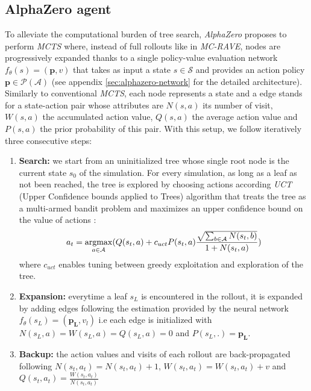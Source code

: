 \documentclass[journal, a4paper]{IEEEtran}
\newcommand{\argmax}{\operatornamewithlimits{argmax}}
\begin{document}
\subsection{AlphaZero agent}
\label{ssec:alphazero}
    To alleviate the computational burden of tree search, \textit{AlphaZero}\cite{alphazero} proposes to perform \textit{MCTS} where, instead of full rollouts like in \textit{MC-RAVE}, nodes are progressively expanded thanks to a single policy-value evaluation network $f_\theta(s)=(\mathbf{p}, v)$ that takes as input a state $s\in \mathcal{S}$ and provides an action policy $\mathbf{p}\in\mathcal{P}(\mathcal{A})$ (see appendix \ref{sec:alphazero-network} for the detailed architecture). Similarly to conventional \textit{MCTS}, each node represents a state and a edge stands for a state-action pair whose attributes are $N(s,a)$ its number of visit, $W(s,a)$ the accumulated action value, $Q(s,a)$ the average action value and $P(s,a)$ the prior probability of this pair. With this setup, we follow iteratively three consecutive steps:
    \begin{enumerate}
        \item \textbf{Search:} we start from an uninitialized tree whose single root node is the current state $s_0$ of the simulation. For every simulation, as long as a leaf as not been reached, the tree is explored by choosing actions according \textit{UCT} (Upper Confidence bounds applied to Trees) algorithm that treats the tree as a multi-armed bandit problem and maximizes an upper confidence bound on the value of actions : $$a_t=\argmax_{a\in\mathcal{A}}(Q(s_t, a)+c_{uct}P(s_t,a)\frac{\sqrt{\sum_{b\in\mathcal{A}}N(s_t, b)}}{1+N(s_t,a)})$$ where $c_{uct}$ enables tuning between greedy exploitation and exploration of the tree.
        \item \textbf{Expansion:} everytime a leaf $s_L$ is encountered in the rollout, it is expanded by adding edges following the estimation provided by the neural network $f_\theta(s_L)=(\mathbf{p_L}, v_l)$ i.e each edge is initialized with $N(s_L, a)=W(s_L,a)=Q(s_L,a)=0$ and $P(s_L,.)=\mathbf{p_L}$.
        \item \textbf{Backup:} the action values and visits of each rollout are back-propagated following $N(s_t, a_t) = N(s_t, a_t) + 1$, $W(s_t, a_t) = W(s_t, a_t) + v$ and $Q(s_t, a_t)=\frac{W(s_t, a_t)}{N(s_t, a_t)}$
    \end{enumerate}
\end{document}

